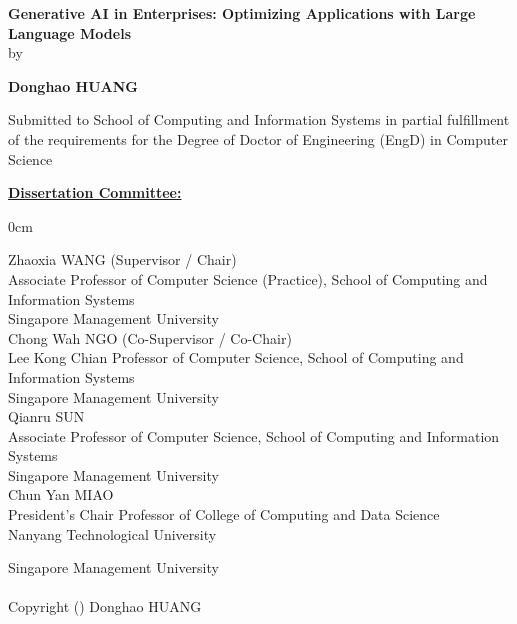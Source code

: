 \documentclass[a4paper,12pt,singleside]{report}
\def\authorname{Donghao HUANG}
\def\titletext{Generative AI in Enterprises: Optimizing Applications with Large Language Models}
\begin{document}
\begin{titlepage}
\begin{center}
    
\vspace*{2cm}

{\Large \bfseries \titletext}\\[1cm]

{\large by}
\vspace{-3pt}

{\large\bf \authorname}\\[.5cm]

\begin{singlespace}
Submitted to School of Computing and Information Systems in partial fulfillment of the requirements for the Degree of Doctor of Engineering (EngD) in Computer Science\\[1cm]
\end{singlespace}

\vspace*{-0.5cm}
{\bf \underline{Dissertation Committee:}}\\[0.5cm]

\end{center}

\begin{addmargin}[2.5cm]{0cm}
    \begin{singlespace}
        Zhaoxia \textsc{WANG} (Supervisor / Chair)\\
        Associate Professor of Computer Science (Practice), School of Computing and Information Systems\\
        Singapore Management University
        \\[0.5cm]
        Chong Wah \textsc{NGO} (Co-Supervisor / Co-Chair)\\
        Lee Kong Chian Professor of Computer Science, School of Computing and Information Systems\\
        Singapore Management University 
        \\[0.5cm]
        Qianru \textsc{SUN} \\
        Associate Professor of Computer Science, School of Computing and Information Systems\\
        Singapore Management University
        \\[0.5cm]
        Chun Yan \textsc{MIAO} \\
        President’s Chair Professor of College of Computing and Data Science\\
        Nanyang Technological University
    \end{singlespace}
\end{addmargin}

\begin{center}
\vfill {\large Singapore Management University\\\vspace{-3pt}\gradyear}\\
\vspace*{0.2cm}
{Copyright (\gradyear) \authorname}
\end{center}
\end{titlepage}
\end{document}
